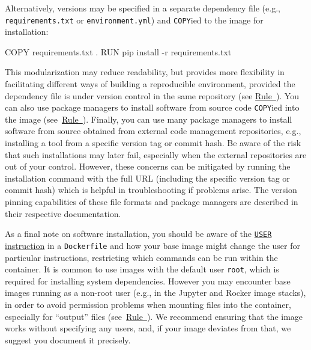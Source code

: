 \documentclass[10pt,letterpaper]{article}
\newenvironment{Shaded}{\begin{snugshade}}{\end{snugshade}}
\newcommand{\ExtensionTok}[1]{#1}
\newcommand{\NormalTok}[1]{#1}
\begin{document}
\normalsize

Alternatively, versions may be specified in a separate dependency file
(e.g., \texttt{requirements.txt} or \texttt{environment.yml}) and
\texttt{COPY}ied to the image for installation:

\footnotesize

\begin{Shaded}
\begin{Highlighting}[]
\ExtensionTok{COPY}\NormalTok{ requirements.txt .}
\ExtensionTok{RUN}\NormalTok{ pip install -r requirements.txt}
\end{Highlighting}
\end{Shaded}

\normalsize

This modularization may reduce readability, but provides more
flexibility in facilitating different ways of building a reproducible
environment, provided the dependency file is under version control in
the same repository (see
\hyperref[{rule:publish}]{Rule~}). You can also
use package managers to install software from source code
\texttt{COPY}ied into the image
(see~\hyperref[{rule:mount}]{Rule~}). Finally, you
can use many package managers to install software from source obtained
from external code management repositories, e.g., installing a tool from
a specific version tag or commit hash. Be aware of the risk that such
installations may later fail, especially when the external repositories
are out of your control. However, these concerns can be mitigated by
running the installation command with the full URL (including the
specific version tag or commit hash) which is helpful in troubleshooting
if problems arise. The version pinning capabilities of these file
formats and package managers are described in their respective
documentation.

As a final note on software installation, you should be aware of the
\href{https://docs.docker.com/engine/reference/builder/\#user}{\texttt{USER}
instruction} in a \texttt{Dockerfile} and how your base image might
change the user for particular instructions, restricting which commands
can be run within the container. It is common to use images with the
default user \texttt{root}, which is required for installing system
dependencies. However you may encounter base images running as a
non-root user (e.g., in the Jupyter and Rocker image stacks), in order
to avoid permission problems when mounting files into the container,
especially for ``output'' files
(see~\hyperref[{rule:mount}]{Rule~}). We recommend
ensuring that the image works without specifying any users, and, if your
image deviates from that, we suggest you document it precisely.
\end{document}
